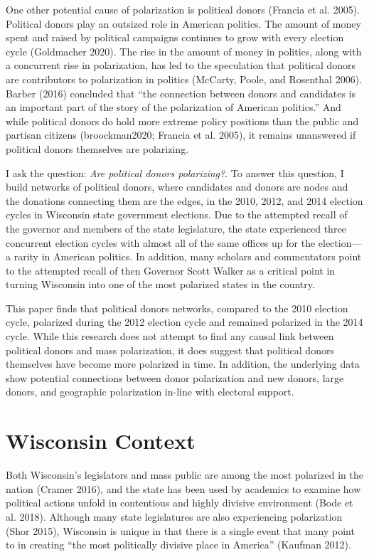 \documentclass[12pt,]{article}
\begin{document}
One other potential cause of polarization is political donors (Francia
et al. 2005). Political donors play an outsized role in American
politics. The amount of money spent and raised by political campaigns
continues to grow with every election cycle (Goldmacher 2020). The rise
in the amount of money in politics, along with a concurrent rise in
polarization, has led to the speculation that political donors are
contributors to polarization in politics (McCarty, Poole, and Rosenthal
2006). Barber (2016) concluded that ``the connection between donors and
candidates is an important part of the story of the polarization of
American politics.'' And while political donors do hold more extreme
policy positions than the public and partisan citizens (broockman2020;
Francia et al. 2005), it remains unanswered if political donors
themselves are polarizing.

I ask the question: \emph{Are political donors polarizing?}. To answer
this question, I build networks of political donors, where candidates
and donors are nodes and the donations connecting them are the edges, in
the 2010, 2012, and 2014 election cycles in Wisconsin state government
elections. Due to the attempted recall of the governor and members of
the state legislature, the state experienced three concurrent election
cycles with almost all of the same offices up for the election---a
rarity in American politics. In addition, many scholars and commentators
point to the attempted recall of then Governor Scott Walker as a
critical point in turning Wisconsin into one of the most polarized
states in the country.

This paper finds that political donors networks, compared to the 2010
election cycle, polarized during the 2012 election cycle and remained
polarized in the 2014 cycle. While this research does not attempt to
find any causal link between political donors and mass polarization, it
does suggest that political donors themselves have become more polarized
in time. In addition, the underlying data show potential connections
between donor polarization and new donors, large donors, and geographic
polarization in-line with electoral support.

\hypertarget{wisconsin-context}{%
\section{Wisconsin Context}\label{wisconsin-context}}

Both Wisconsin's legislators and mass public are among the most
polarized in the nation (Cramer 2016), and the state has been used by
academics to examine how political actions unfold in contentious and
highly divisive environment (Bode et al. 2018). Although many state
legislatures are also experiencing polarization (Shor 2015), Wisconsin
is unique in that there is a single event that many point to in creating
``the most politically divisive place in America'' (Kaufman 2012).
\end{document}
